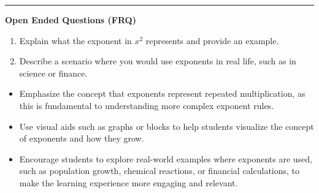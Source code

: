 \documentclass[10pt]{article}
\begin{document}
\vspace{-0.2cm}
\hrule
\vspace{0.2cm}
\textbf{\small Open Ended Questions (FRQ)}
\begin{enumerate}[label=\textbf{Q\arabic*.}, start=9, itemsep=5pt, topsep=0pt]

  \item \small Explain what the exponent in $x^2$ represents and provide an example. \vspace{1.6cm}

  \item \small Describe a scenario where you would use exponents in real life, such as in science or finance. \vspace{1.6cm}

\end{enumerate}

\vfill

\begin{tcolorbox}[colback=blue!5, colframe=mainblue!50, title=\small \textbf{Chef's Tips}, fonttitle=\bfseries, bottom=1mm]
\begin{itemize}[noitemsep, topsep=2pt, leftmargin=0.5cm]
  \item \scriptsize Emphasize the concept that exponents represent repeated multiplication, as this is fundamental to understanding more complex exponent rules.\item \scriptsize Use visual aids such as graphs or blocks to help students visualize the concept of exponents and how they grow.\item \scriptsize Encourage students to explore real-world examples where exponents are used, such as population growth, chemical reactions, or financial calculations, to make the learning experience more engaging and relevant.
\end{itemize}
\end{tcolorbox}
\end{document}
